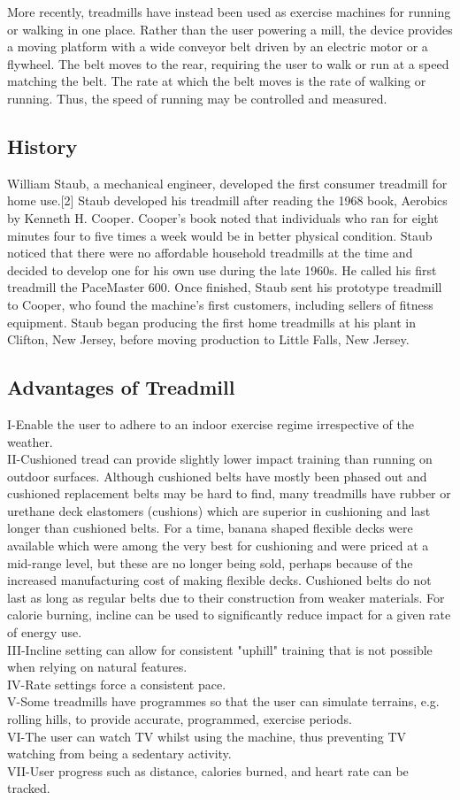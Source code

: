 \documentclass[12pt]{article}
\begin{document}
More recently, treadmills have instead been used as exercise machines for running or walking in one place. Rather than the user powering a mill, the device provides a moving platform with a wide conveyor belt driven by an electric motor or a flywheel. The belt moves to the rear, requiring the user to walk or run at a speed matching the belt. The rate at which the belt moves is the rate of walking or running. Thus, the speed of running may be controlled and measured.
\subsection{History} 
William Staub, a mechanical engineer, developed the first consumer treadmill for home use.[2] Staub developed his treadmill after reading the 1968 book, Aerobics by Kenneth H. Cooper. Cooper's book noted that individuals who ran for eight minutes four to five times a week would be in better physical condition. Staub noticed that there were no affordable household treadmills at the time and decided to develop one for his own use during the late 1960s. He called his first treadmill the PaceMaster 600. Once finished, Staub sent his prototype treadmill to Cooper, who found the machine's first customers, including sellers of fitness equipment.
Staub began producing the first home treadmills at his plant in Clifton, New Jersey, before moving production to Little Falls, New Jersey.
\subsection{Advantages of Treadmill}
I-Enable the user to adhere to an indoor exercise regime irrespective of the weather.\\
II-Cushioned tread can provide slightly lower impact training than running on outdoor surfaces. Although cushioned belts have mostly been phased out and cushioned replacement belts may be hard to find, many treadmills have rubber or urethane deck elastomers (cushions) which are superior in cushioning and last longer than cushioned belts. For a time, banana shaped flexible decks were available which were among the very best for cushioning and were priced at a mid-range level, but these are no longer being sold, perhaps because of the increased manufacturing cost of making flexible decks. Cushioned belts do not last as long as regular belts due to their construction from weaker materials. For calorie burning, incline can be used to significantly reduce impact for a given rate of energy use.\\
III-Incline setting can allow for consistent "uphill" training that is not possible when relying on natural features.\\
IV-Rate settings force a consistent pace.\\
V-Some treadmills have programmes so that the user can simulate terrains, e.g. rolling hills, to provide accurate, programmed, exercise periods.\\
VI-The user can watch TV whilst using the machine, thus preventing TV watching from being a sedentary activity.\\
VII-User progress such as distance, calories burned, and heart rate can be tracked.
\end{document}
